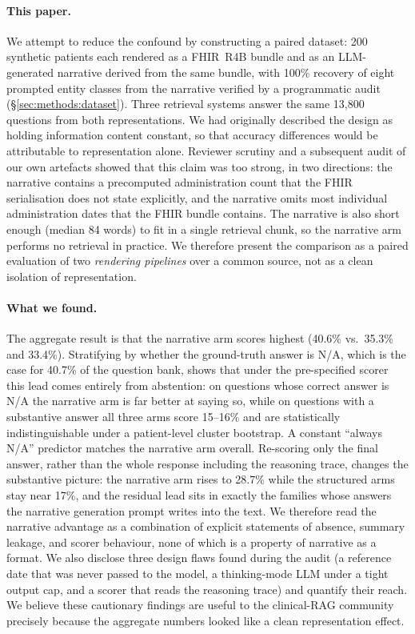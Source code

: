 \paragraph{This paper.}
We attempt to reduce the confound by constructing a paired dataset: 200 synthetic
patients each rendered as a FHIR~R4B bundle and as an LLM-generated narrative derived from
the same bundle, with 100\% recovery of eight prompted entity classes from the narrative
verified by a programmatic audit (\S\ref{sec:methods:dataset}).  Three retrieval systems
answer the same 13,800 questions from both representations.  We had originally described
the design as holding information content constant, so that accuracy differences would be
attributable to representation alone.  Reviewer scrutiny and a subsequent audit of our own
artefacts showed that this claim was too strong, in two directions: the narrative
contains a precomputed administration count that the FHIR serialisation does not state
explicitly, and the narrative omits most individual administration dates that the FHIR
bundle contains.  The narrative is also short enough (median 84 words) to fit in a single
retrieval chunk, so the narrative arm performs no retrieval in practice.  We therefore
present the comparison as a paired evaluation of two \emph{rendering pipelines} over a
common source, not as a clean isolation of representation.

\paragraph{What we found.}
The aggregate result is that the narrative arm scores highest (40.6\% vs.\ 35.3\% and
33.4\%).  Stratifying by whether the ground-truth answer is N/A, which is the case for
40.7\% of the question bank, shows that under the pre-specified scorer this lead comes
entirely from abstention: on questions whose correct answer is N/A the narrative arm is
far better at saying so, while on questions with a substantive answer all three arms score
15--16\% and are statistically indistinguishable under a patient-level cluster bootstrap.
A constant ``always N/A'' predictor matches the narrative arm overall.  Re-scoring only the
final answer, rather than the whole response including the reasoning trace, changes the
substantive picture: the narrative arm rises to 28.7\% while the structured arms stay near
17\%, and the residual lead sits in exactly the families whose answers the narrative
generation prompt writes into the text.  We therefore read the narrative advantage as a
combination of explicit statements of absence, summary leakage, and scorer behaviour, none
of which is a property of narrative as a format.  We also disclose three design flaws
found during the audit (a reference date that was never passed to the model, a
thinking-mode LLM under a tight output cap, and a scorer that reads the reasoning trace)
and quantify their reach.  We believe these cautionary findings are useful to the
clinical-RAG community precisely because the aggregate numbers looked like a clean
representation effect.

